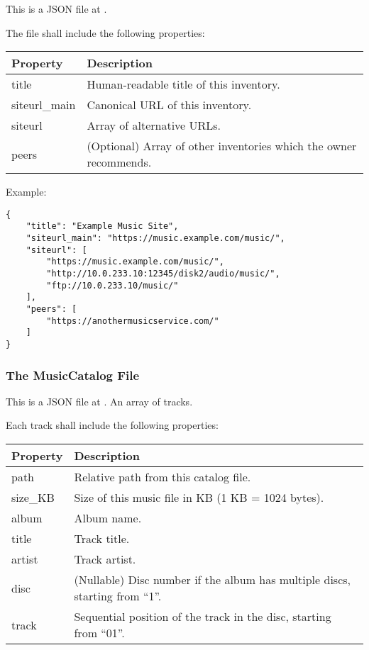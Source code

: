 \documentclass[a4paper,11pt]{article}
\begin{document}
This is a JSON file at .

The file shall include the following properties:

\begin{tabu}{|l|X|}
	\hline
	{Property}      & {Description}                                                       \\
	\hline
	{title}         & {Human-readable title of this inventory.}                           \\
	{siteurl\_main} & {Canonical URL of this inventory.}                                  \\
	{siteurl}       & {Array of alternative URLs.}                                        \\
	{peers}         & {(Optional) Array of other inventories which the owner recommends.} \\
	\hline
\end{tabu}

Example:

\begin{lstlisting}
{
    "title": "Example Music Site",
    "siteurl_main": "https://music.example.com/music/",
    "siteurl": [
        "https://music.example.com/music/",
        "http://10.0.233.10:12345/disk2/audio/music/",
        "ftp://10.0.233.10/music/"
    ],
    "peers": [
        "https://anothermusicservice.com/"
    ]
}
\end{lstlisting}

\subsubsection{The MusicCatalog File}

This is a JSON file at . An array of tracks.

Each track shall include the following properties:

\begin{tabu}{|l|X|}
	\hline
	{Property} & {Description}                                                                  \\
	\hline
	{path}     & {Relative path from this catalog file.}                                        \\
	{size\_KB} & {Size of this music file in KB (1 KB = 1024 bytes).}                           \\
	{album}    & {Album name.}                                                                  \\
	{title}    & {Track title.}                                                                 \\
	{artist}   & {Track artist.}                                                                \\
	{disc}     & {(Nullable) Disc number if the album has multiple discs, starting from ``1''.} \\
	{track}    & {Sequential position of the track in the disc, starting from ``01''.}          \\
	\hline
\end{tabu}
\end{document}
